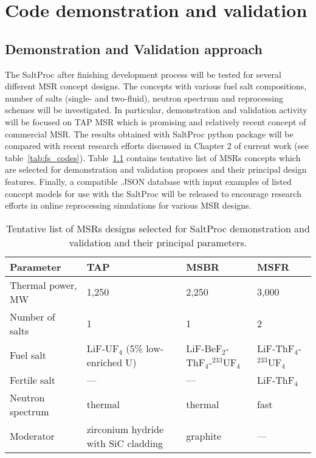 \chapter[Code demonstration and validation]{Code demonstration and validation}

\section{Demonstration and Validation approach}
The SaltProc after finishing development process will be tested for several 
different \gls{MSR} concept designs. The concepts with various fuel salt 
compositions, number of salts (single- and two-fluid), neutron spectrum and 
reprocessing schemes will be investigated. In particular, demonstration 
and validation activity will be focused on \gls{TAP} \gls{MSR} which is 
promising and relatively recent concept of commercial \gls{MSR}. The results 
obtained with SaltProc python package will be compared with recent research 
efforts 
discussed in Chapter 2 of current work (see table~\ref{tab:fs_codes}). 
Table~\ref{tab:msr_concepts} 
contains tentative list of \glspl{MSR} concepts which are selected for 
demonstration and validation proposes and their principal design features. 
Finally, a compatible .JSON database with input examples of listed 
concept models for use with the SaltProc will be released to encourage 
research efforts in online reprocessing simulations for various 
\gls{MSR} designs.
\begin{table}[!htb]
  \centering
  \caption{Tentative list of \glspl{MSR} designs selected for SaltProc 
  demonstration and validation and their principal parameters.}
  \label{tab:msr_concepts} 
  \begin{tabular}{p{} p{} p{} p{} } \toprule 
   Parameter & \gls{TAP} & \gls{MSBR} & \gls{MSFR}  \\ \midrule
   Thermal power, MW	&  1,250   & 2,250     & 3,000     \\ 
   Number of salts      & 1 		& 1 		& 2  		\\ 
   Fuel salt 			& LiF-UF$_4$ \newline (5\% low-enriched U) & LiF-BeF$_2$-ThF$_4$-$^{233}$UF$_4$ & 
   LiF-ThF$_4$-$^{233}$UF$_4$  \\
   Fertile salt 		& --- & --- &   LiF-ThF$_4$  \\
   Neutron spectrum     & thermal  & thermal & fast \\
   Moderator            & zirconium hydride with SiC cladding  & graphite & --- \\
     \bottomrule 
   \end{tabular}
\end{table}

